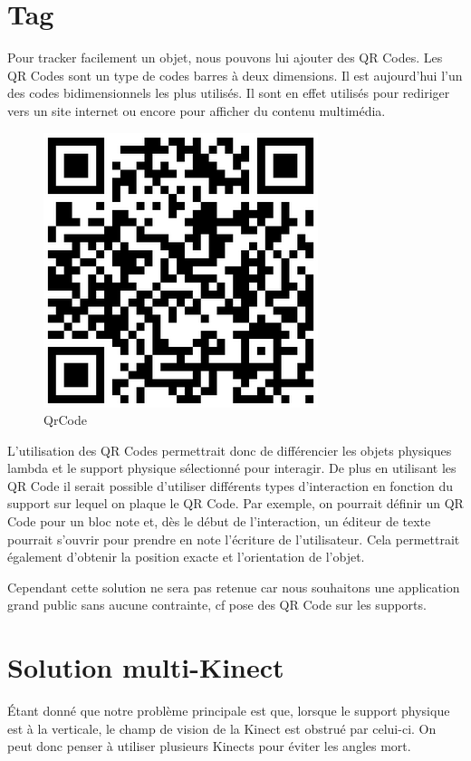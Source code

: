 \section{Tag}

Pour tracker facilement un objet, nous pouvons lui ajouter des QR Codes. Les QR Codes sont un type de codes barres à deux dimensions. Il est aujourd’hui l’un des codes bidimensionnels les plus utilisés. Il sont en effet utilisés pour rediriger vers un site internet ou encore pour afficher du contenu multimédia.

\begin{figure}[!ht]
	\center	
	\includegraphics[scale=0.25]{image/qrcode.png}
	\caption{QrCode}
\end{figure}

L’utilisation des QR Codes permettrait donc de différencier les objets physiques lambda et le support physique sélectionné pour interagir. De plus en utilisant les QR Code il serait possible d’utiliser différents types d’interaction en fonction du support sur lequel on plaque le QR Code. Par exemple, on pourrait définir un QR Code pour un bloc note et, dès le début de l’interaction, un éditeur de texte pourrait s’ouvrir pour prendre en note l’écriture de l’utilisateur. Cela permettrait également d’obtenir la position exacte et l’orientation de l’objet. 

Cependant cette solution ne sera pas retenue car nous souhaitons une application grand public sans aucune contrainte, cf pose des QR Code sur les supports.

\section{Solution multi-Kinect}

Étant donné que notre problème principale est que, lorsque le support physique est à la verticale, le champ de vision de la Kinect est obstrué par celui-ci. On peut donc penser à utiliser plusieurs Kinects pour éviter les angles mort. 

